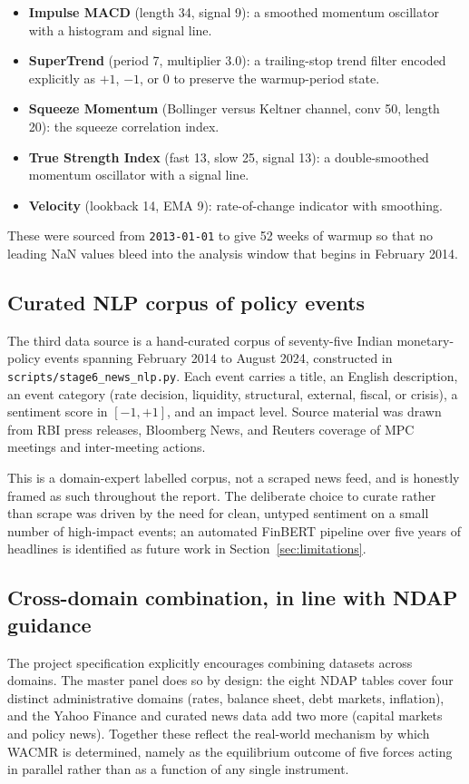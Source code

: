 \begin{itemize}
\item \textbf{Impulse MACD} (length 34, signal 9): a smoothed momentum
  oscillator with a histogram and signal line.
\item \textbf{SuperTrend} (period 7, multiplier 3.0): a trailing-stop
  trend filter encoded explicitly as $+1$, $-1$, or $0$ to preserve
  the warmup-period state.
\item \textbf{Squeeze Momentum} (Bollinger versus Keltner channel,
  conv 50, length 20): the squeeze correlation index.
\item \textbf{True Strength Index} (fast 13, slow 25, signal 13): a
  double-smoothed momentum oscillator with a signal line.
\item \textbf{Velocity} (lookback 14, EMA 9): rate-of-change indicator
  with smoothing.
\end{itemize}

These were sourced from \texttt{2013-01-01} to give 52 weeks of
warmup so that no leading NaN values bleed into the analysis window
that begins in February 2014.

\subsection{Curated NLP corpus of policy events}

The third data source is a hand-curated corpus of seventy-five Indian
monetary-policy events spanning February 2014 to August 2024,
constructed in \texttt{scripts/stage6\_news\_nlp.py}. Each event carries a
title, an English description, an event category (rate decision,
liquidity, structural, external, fiscal, or crisis), a sentiment score
in $[-1, +1]$, and an impact level. Source material was drawn from RBI
press releases, Bloomberg News, and Reuters coverage of MPC meetings
and inter-meeting actions.

\begin{warningbox}
This is a domain-expert labelled corpus, not a scraped news feed, and
is honestly framed as such throughout the report. The deliberate choice
to curate rather than scrape was driven by the need for clean, untyped
sentiment on a small number of high-impact events; an automated FinBERT
pipeline over five years of headlines is identified as future work in
Section~\ref{sec:limitations}.
\end{warningbox}

\subsection{Cross-domain combination, in line with NDAP guidance}

The project specification explicitly encourages combining datasets
across domains. The master panel does so by design: the eight NDAP
tables cover four distinct administrative domains (rates, balance
sheet, debt markets, inflation), and the Yahoo Finance and curated
news data add two more (capital markets and policy news). Together
these reflect the real-world mechanism by which WACMR is determined,
namely as the equilibrium outcome of five forces acting in parallel
rather than as a function of any single instrument.
